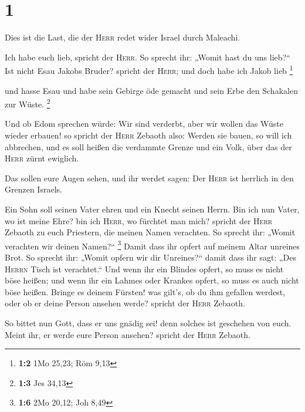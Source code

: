 \hypertarget{section}{%
\section{1}\label{section}}

 Dies ist die Last, die der \textsc{Herr} redet wider
Israel durch Maleachi.

 Ich habe euch lieb, spricht der \textsc{Herr}. So sprecht
ihr: „Womit hast du uns lieb?{}`` Ist nicht Esau Jakobs Bruder? spricht
der \textsc{Herr}; und doch habe ich Jakob lieb \footnote{\textbf{1:2}
  1Mo 25,23; Röm 9,13}

 und hasse Esau und habe sein Gebirge öde gemacht und sein
Erbe den Schakalen zur Wüste. \footnote{\textbf{1:3} Jes 34,13}

 Und ob Edom sprechen würde: Wir sind verderbt, aber wir
wollen das Wüste wieder erbauen! so spricht der \textsc{Herr} Zebaoth
also: Werden sie bauen, so will ich abbrechen, und es soll heißen die
verdammte Grenze und ein Volk, über das der \textsc{Herr} zürnt
ewiglich.

 Das sollen eure Augen sehen, und ihr werdet sagen: Der
\textsc{Herr} ist herrlich in den Grenzen Israels.

 Ein Sohn soll seinen Vater ehren und ein Knecht seinen
Herrn. Bin ich nun Vater, wo ist meine Ehre? bin ich \textsc{Herr}, wo
fürchtet man mich? spricht der \textsc{Herr} Zebaoth zu euch Priestern,
die meinen Namen verachten. So sprecht ihr: „Womit verachten wir deinen
Namen?{}`` \footnote{\textbf{1:6} 2Mo 20,12; Joh 8,49} 
Damit dass ihr opfert auf meinem Altar unreines Brot. So sprecht ihr:
„Womit opfern wir dir Unreines?{}`` damit dass ihr sagt: „Des
\textsc{Herrn} Tisch ist verachtet.``  Und wenn ihr ein
Blindes opfert, so muss es nicht böse heißen; und wenn ihr ein Lahmes
oder Krankes opfert, so muss es auch nicht böse heißen. Bringe es deinem
Fürsten! was gilt's, ob du ihm gefallen werdest, oder ob er deine Person
ansehen werde? spricht der \textsc{Herr} Zebaoth.

 So bittet nun Gott, dass er uns gnädig sei! denn solches
ist geschehen von euch. Meint ihr, er werde eure Person ansehen? spricht
der \textsc{Herr} Zebaoth.

